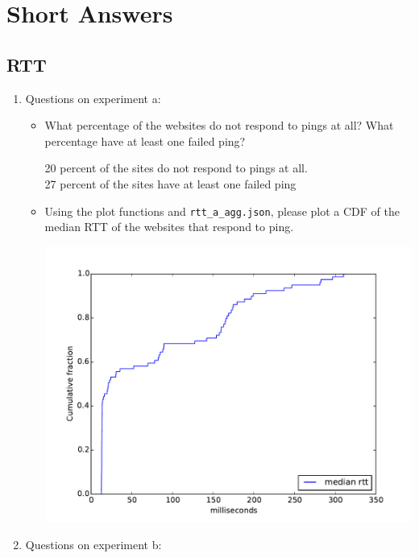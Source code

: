 \documentclass[10pt]{article}
\begin{document}
\section*{Short Answers}

\subsection*{RTT}

\begin{enumerate}
\item Questions on experiment a:

\begin{itemize}
\item What percentage of the websites do not respond to pings at all? What percentage have at least one failed ping?

20 percent of the sites do not respond to pings at all.
\\
27 percent of the sites have at least one failed ping

\item Using the plot functions and \texttt{rtt\_a\_agg.json}, please plot a CDF of the median RTT of the websites that respond to ping.

\includegraphics[scale=0.5]{plot_median_rtt.pdf}

\end{itemize}

\item Questions on experiment b:

\begin{itemize}


\end{itemize}
\end{enumerate}
\end{document}

